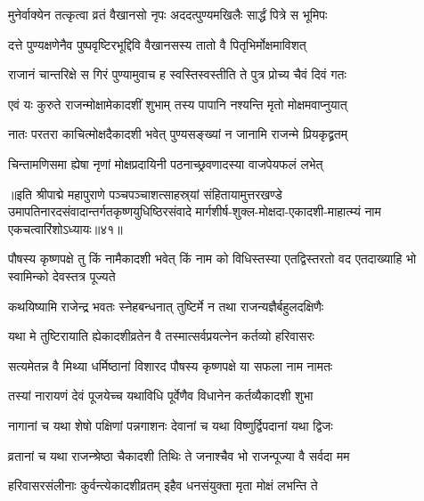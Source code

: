\twolineshloka
{मुनेर्वाक्येन तत्कृत्वा व्रतं वैखानसो नृपः}
{अददत्पुण्यमखिलैः सार्द्धं पित्रे स भूमिपः}%

\twolineshloka
{दत्ते पुण्यक्षणेनैव पुष्पवृष्टिरभूद्दिवि}
{वैखानसस्य तातो वै पितृभिर्मोक्षमाविशत्}%

\twolineshloka
{राजानं चान्तरिक्षे स गिरं पुण्यामुवाच ह}
{स्वस्तिस्वस्तीति ते पुत्र प्रोच्य चैवं दिवं गतः}%

\twolineshloka
{एवं यः कुरुते राजन्मोक्षामेकादशीं शुभाम्}
{तस्य पापानि नश्यन्ति मृतो मोक्षमवाप्नुयात्}%

\twolineshloka
{नातः परतरा काचित्मोक्षदैकादशी भवेत्}
{पुण्यसङ्ख्यां न जानामि राजन्मे प्रियकृद्व्रतम्}%

\twolineshloka
{चिन्तामणिसमा ह्येषा नृणां मोक्षप्रदायिनी}
{पठनाच्छ्रवणादस्या वाजपेयफलं लभेत्}%

॥इति श्रीपाद्मे महापुराणे पञ्चपञ्चाशत्साहस्र्यां संहितायामुत्तरखण्डे उमापतिनारदसंवादान्तर्गतकृष्णयुधिष्ठिरसंवादे मार्गशीर्ष-शुक्ल-मोक्षदा-एकादशी-माहात्म्यं नाम एकचत्वारिंशोऽध्यायः॥४१॥


\hyperref[sec:ekadashi_mahatmyam_padma_puranam]{\closesub}
\clearpage

\label{sec:padma-pausha-krishna-saphala}



\threelineshloka
{पौषस्य  कृष्णपक्षे तु किं नामैकादशी भवेत्}
{किं नाम को विधिस्तस्या एतद्विस्तरतो वद}
{एतदाख्याहि भो स्वामिन्को देवस्तत्र पूज्यते}%


\twolineshloka
{कथयिष्यामि राजेन्द्र भवतः स्नेहबन्धनात्}
{तुष्टिर्मे न तथा राजन्यज्ञैर्बहुलदक्षिणैः}%

\twolineshloka
{यथा मे तुष्टिरायाति ह्येकादशीव्रतेन वै}
{तस्मात्सर्वप्रयत्नेन कर्तव्यो हरिवासरः}%

\twolineshloka
{सत्यमेतन्न वै मिथ्या धर्मिष्ठानां विशारद}
{पौषस्य कृष्णपक्षे या सफला नाम नामतः}%

\twolineshloka
{तस्यां नारायणं देवं पूजयेच्च यथाविधि}
{पूर्वेणैव विधानेन कर्तव्यैकादशी शुभा}%

\twolineshloka
{नागानां च यथा शेषो पक्षिणां पन्नगाशनः}
{देवानां च यथा विष्णुर्द्विपदानां यथा द्विजः}%

\twolineshloka
{व्रतानां च यथा राजन्श्रेष्ठा चैकादशी तिथिः}
{ते जनाश्चैव भो राजन्पूज्या वै सर्वदा मम}%

\twolineshloka
{हरिवासरसंलीनाः कुर्वन्त्येकादशीव्रतम्}
{इहैव धनसंयुक्ता मृता मोक्षं लभन्ति ते}%

